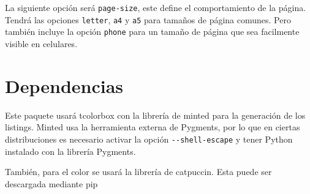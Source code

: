 \documentclass{qx-files/qx-notes}
\begin{document}
  La siguiente opción será \verb|page-size|, este define el comportamiento de la página. Tendrá las opciones \verb|letter|, \verb|a4| y \verb|a5| para tamaños de página comunes. Pero también incluye la opción \verb|phone| para un tamaño de página que sea facilmente visible en celulares.


  \section{Dependencias}

  Este paquete usará tcolorbox con la librería de minted para la generación de los listings. Minted usa la herramienta externa de Pygments, por lo que en ciertas distribuciones es necesario activar la opción \verb|--shell-escape| y tener Python instalado con la librería Pygments.

  También, para el color se usará la librería de catpuccin. Esta puede ser descargada mediante pip
\end{document}
